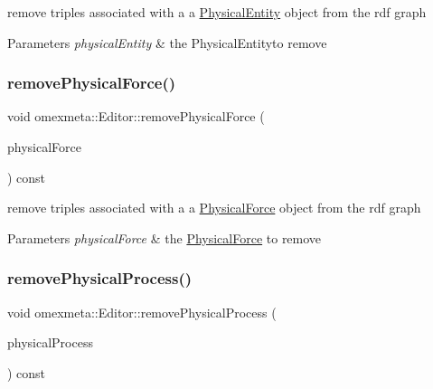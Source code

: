 remove triples associated with a a \hyperlink{classomexmeta_1_1PhysicalEntity}{Physical\+Entity} object from the rdf graph 


\begin{DoxyParams}{Parameters}
{\em physical\+Entity} & the Physical\+Entityto remove \\
\hline
\end{DoxyParams}
\mbox{\label{classomexmeta_1_1Editor_ad99187ec52bef1af440af5d9560f32c5}} 
\subsubsection{\texorpdfstring{remove\+Physical\+Force()}{removePhysicalForce()}}
{\footnotesize\ttfamily void omexmeta\+::\+Editor\+::remove\+Physical\+Force (\begin{DoxyParamCaption}\item[{\hyperlink{classomexmeta_1_1PhysicalForce}{Physical\+Force} \&}]{physical\+Force }\end{DoxyParamCaption}) const}



remove triples associated with a a \hyperlink{classomexmeta_1_1PhysicalForce}{Physical\+Force} object from the rdf graph 


\begin{DoxyParams}{Parameters}
{\em physical\+Force} & the \hyperlink{classomexmeta_1_1PhysicalForce}{Physical\+Force} to remove \\
\hline
\end{DoxyParams}
\mbox{\label{classomexmeta_1_1Editor_a42640d74c6afe780738c906bdf346a78}} 
\subsubsection{\texorpdfstring{remove\+Physical\+Process()}{removePhysicalProcess()}}
{\footnotesize\ttfamily void omexmeta\+::\+Editor\+::remove\+Physical\+Process (\begin{DoxyParamCaption}\item[{\hyperlink{classomexmeta_1_1PhysicalProcess}{Physical\+Process} \&}]{physical\+Process }\end{DoxyParamCaption}) const}



